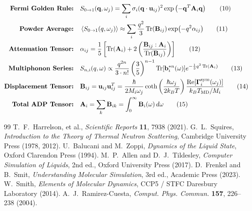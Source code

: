 \documentclass[11pt,a4paper]{article}
\theoremstyle{definition}
\begin{document}
\begin{tcolorbox}[colback=white,colframe=blue!40!black,title=\textbf{Summary of Equations}]
\begin{align}
\text{\textbf{Fermi Golden Rule:}} \quad & S_{0 \to 1}(\mathbf{q}, \omega_j) = \sum_i \sigma_i (\mathbf{q} \cdot \mathbf{u}_{ij})^2 \exp\left( -\mathbf{q}^T \mathbf{A}_i \mathbf{q} \right) \tag{10} \\
\text{\textbf{Powder Average:}} \quad & \ev{S_{0 \to 1}(q, \omega_j)} \approx \sum_i \frac{q^2}{3} \Tr(\mathbf{B}_{ij}) \exp(-q^2 \alpha_{ij}) \tag{11} \\
\text{\textbf{Attenuation Tensor:}} \quad & \alpha_{ij} = \frac{1}{5} \left[ \Tr(\mathbf{A}_i) + 2 \left( \frac{\mathbf{B}_{ij} : \mathbf{A}_i}{\Tr(\mathbf{B}_{ij})} \right) \right] \tag{12} \\
\text{\textbf{Multiphonon Series:}} \quad & S_{n,i}(q, \omega) \propto \frac{q^{2n}}{3 \cdot n!} \left(\frac{3}{5}\right)^{n-1} \Tr[\mathbf{b}_i^{*n}(\omega)] e^{-\frac{1}{3}q^2 \Tr(\mathbf{A}_i)} \tag{13} \\
\text{\textbf{Displacement Tensor:}} \quad & \mathbf{B}_{ij} = \mathbf{u}_{ij} \mathbf{u}_{ij}^T = \frac{\hbar}{2 M_i \omega_j} \coth\left(\frac{\hbar\omega_j}{2k_BT}\right) \frac{\operatorname{Re}[\mathbf{\Gamma}_i^{\text{sym}}(\omega_j)]}{k_B T_{\text{MD}}/M_i} \tag{14} \\
\text{\textbf{Total ADP Tensor:}} \quad & \mathbf{A}_i = \sum_k \mathbf{B}_{ik} = \int_0^\infty \mathbf{B}_i(\omega) \, d\omega \tag{15}
\end{align}
\end{tcolorbox}

\begin{thebibliography}{99}
 T.~F.~Harrelson, et al., \emph{Scientific Reports} \textbf{11}, 7938 (2021).
 G.~L.~Squires, \emph{Introduction to the Theory of Thermal Neutron Scattering}, Cambridge University Press (1978, 2012).
 U.~Balucani and M.~Zoppi, \emph{Dynamics of the Liquid State}, Oxford Clarendon Press (1994).
 M.~P.~Allen and D.~J.~Tildesley, \emph{Computer Simulation of Liquids}, 2nd ed., Oxford University Press (2017).
 D.~Frenkel and B.~Smit, \emph{Understanding Molecular Simulation}, 3rd ed., Academic Press (2023).
 W.~Smith, \emph{Elements of Molecular Dynamics}, CCP5 / STFC Daresbury Laboratory (2014).
 A.~J.~Ramirez-Cuesta, \emph{Comput. Phys. Commun.} \textbf{157}, 226--238 (2004).
\end{thebibliography}
\end{document}
